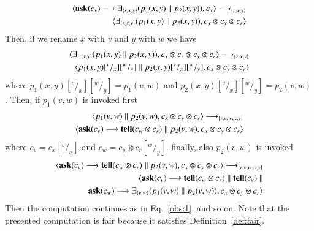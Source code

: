 \documentclass[main.tex]{subfiles}
\begin{document}
\begin{example}
    \begin{equation}
    \begin{split}
    \langle {\bf ask}(c_y) \longrightarrow \exists_{\{r,x,y\}} (p_1(x,y) \parallel p_2(x,y)), c_x\rangle \longrightarrow_{\{r,x,y\}}\\ \langle \exists_{\{r,x,y\}} (p_1(x,y) \parallel p_2(x,y)), c_x \otimes c_y \otimes c_r\rangle
    \end{split}
    \end{equation}
  Then, if we rename $x$ with $v$ and $y$ with $w$ we have
     \begin{equation}
      \begin{split}
      \langle \exists_{\{r,x,y\}} (p_1(x,y) \parallel p_2(x,y)), c_x \otimes c_r \otimes c_y \otimes c_r\rangle  \longrightarrow_{\{r,x,y\}}\\ \langle p_1(x,y)[^v/_x][^w/_y] \parallel p_2(x,y)[^v/_x][^w/_y], c_x \otimes c_y \otimes c_r\rangle
      \end{split}
      \end{equation}
      where $p_1(x,y)[^v/_x][^w/_y] = p_1(v,w)$ and $p_2(x,y)[^v/_x][^w/_y] = p_2(v,w)$. Then, if $p_1(v,w)$ is invoked first
      \begin{equation}
      \begin{split}
      \langle p_1(v,w) \parallel p_2(v,w), c_x \otimes c_y \otimes c_r\rangle \longrightarrow_{\{r,v,w,x,y\}}\\ \langle  {\bf ask}(c_v) \longrightarrow {\bf tell}(c_w \otimes c_r) \parallel p_2(v,w), c_x\otimes c_y \otimes c_r\rangle 
      \end{split}
      \end{equation}
      where $c_v = c_x[^v/_x]$ and $c_w = c_y \otimes c_r[^w/_y]$. finally, also $p_2(v,w)$ is invoked
      \begin{equation}\label{obs:last}
      \begin{split}
      \langle {\bf ask}(c_v) \longrightarrow {\bf tell}(c_w \otimes c_r) \parallel p_2(v,w), c_x \otimes c_y \otimes c_r\rangle \longrightarrow_{\{r,v,w,x,y\}} \\ \langle {\bf ask}(c_v) \longrightarrow {\bf tell}(c_w \otimes c_r) \parallel {\bf tell}(c_v) \parallel \\ {\bf ask}(c_w) \longrightarrow \exists_{\{v,w\}} (p_1(v,w) \parallel p_2(v,w)), c_x \otimes c_y \otimes c_r\rangle
      \end{split}
      \end{equation}
Then the computation continues as in Eq.~\ref{obs:1}, and so on. Note that the presented computation is fair because it satisfies Definition~\ref{def:fair}.
\end{example}
\end{document}
